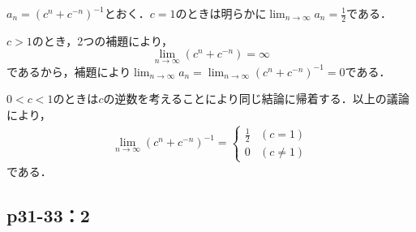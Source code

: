 \documentclass[a4paper,10pt,fleqn]{ltjsarticle}
\begin{document}
\begin{tleftbar}
    $a_n = (c^n +c^{-n})^{-1}$とおく．$c=1$のときは明らかに$\lim_{n \to \infty} a_n =\frac{1}{2}$である．

    $c>1$のとき，2つの補題により，
    \[
        \lim_{n \to \infty} (c^n + c^{-n}) = \infty
    \]
    であるから，補題により$\lim_{n \to \infty} a_n = \lim_{n \to \infty} (c^n +c^{-n})^{-1} =0$である．

    $0<c<1$のときは$c$の逆数を考えることにより同じ結論に帰着する．以上の議論により，
    \begin{align*}
        \lim_{n \to \infty} (c^n +c^{-n})^{-1} =
        \begin{cases}
            \frac{1}{2}&(c=1)\\
            0 & (c \ne 1)
        \end{cases}
    \end{align*}
    である．
\end{tleftbar}


\subsection*{p31-33：2}
\end{document}

